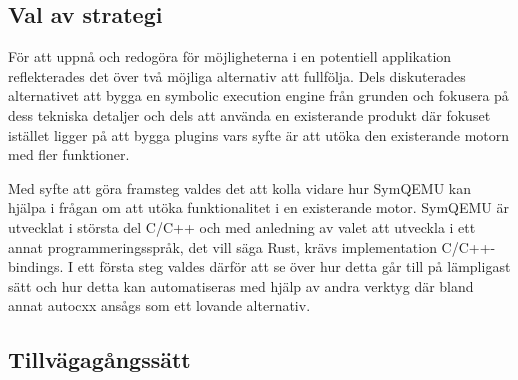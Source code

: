 \subsection{Val av strategi}
För att uppnå och redogöra för möjligheterna i en potentiell applikation reflekterades det över två möjliga 
alternativ att fullfölja. Dels diskuterades alternativet att bygga en symbolic execution engine från grunden och fokusera på
dess tekniska detaljer och dels att använda en existerande produkt där fokuset istället ligger på att bygga plugins vars
syfte är att utöka den existerande motorn med fler funktioner. 

Med syfte att göra framsteg valdes det att kolla vidare hur SymQEMU kan hjälpa i frågan om att utöka funktionalitet
i en existerande motor. SymQEMU är utvecklat i största del C/C++ och med anledning av valet att utveckla i ett annat
programmeringsspråk, det vill säga Rust, krävs implementation C/C++-bindings. I ett första steg valdes därför att 
se över hur detta går till på lämpligast sätt och hur detta kan automatiseras med hjälp av andra verktyg där bland annat 
autocxx ansågs som ett lovande alternativ. 

\subsection{Tillvägagångssätt}



